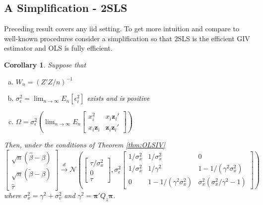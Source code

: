 \documentclass[12pt]{article}\usepackage[]{graphicx}\usepackage[]{color}
\newtheorem{cor}{Corollary}[section]
\theoremstyle{definition}
\begin{document}
\subsection{A Simplification - 2SLS}
Preceding result covers any iid setting. To get more intuition and compare to well-known procedures consider a simplification so that 2SLS is the efficient GIV estimator and OLS is fully efficient. 

\begin{cor}
Suppose that 
  \begin{enumerate}[(a)]
    \item $W_n =(Z'Z/n)^{-1}$
    \item $\sigma_\epsilon^2 = \lim_{n \rightarrow \infty} E_n[\epsilon_i^2]$ exists and is positive
    \item $\displaystyle \Omega =\sigma_\epsilon^2 \left(\lim_{n\rightarrow \infty} E_n \left[
    \begin{array}{cc}
      x_i^2 & x_i \mathbf{z}_i' \\
       x_i \mathbf{z}_i& \mathbf{z}_i \mathbf{z}_i'
    \end{array}
    \right]\right)$
  \end{enumerate}
Then, under the conditions of Theorem \ref{thm:OLSIV}
$$
\left[
\begin{array}{c}
  \sqrt{n}\left(\widehat{\beta} - \beta\right) \\
  \sqrt{n}\left(\widetilde{\beta} - \beta\right)\\
  \widehat{\tau}
\end{array}
\right] \overset{d}{\rightarrow}
\mathcal{N}\left(
\left[
\begin{array}{c}
\tau/\sigma_x^2 \\ 
0\\
\tau
\end{array}
\right],
\sigma_\epsilon^2 \left[ \begin{array}{ccc}
  1/\sigma_x^2 & 1/\sigma_x^2 & 0\\
  1/\sigma_x^2 & 1/\gamma^2 & 1 - 1/(\gamma^2\sigma_x^2)\\
  0& 1 - 1/(\gamma^2 \sigma_x^2) & \sigma_x^2(\sigma_x^2/\gamma^2 - 1)
  \end{array}\right]
  \right)
$$
where $\sigma_x^2 = \gamma^2 + \sigma_v^2$ and $\gamma^2 = \boldsymbol{\pi}'Q_z \boldsymbol{\pi}$.
\end{cor}
\end{document}
